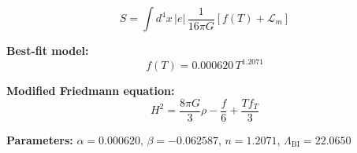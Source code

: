 
\begin{equation}
  S = \int d^4x \, |e| \, \frac{1}{16\pi G} \left[ f(T) + \mathcal{L}_m \right]
\end{equation}

\textbf{Best-fit model:}
\begin{equation}
  f(T) = 0.000620 \, T^{1.2071}
\end{equation}

\textbf{Modified Friedmann equation:}
\begin{equation}
  H^2 = \frac{8\pi G}{3} \rho - \frac{f}{6} + \frac{T f_T}{3}
\end{equation}

\textbf{Parameters:}
$\alpha = 0.000620$, \quad
$\beta = -0.062587$, \quad
$n = 1.2071$, \quad
$\Lambda_{\text{BI}} = 22.0650$